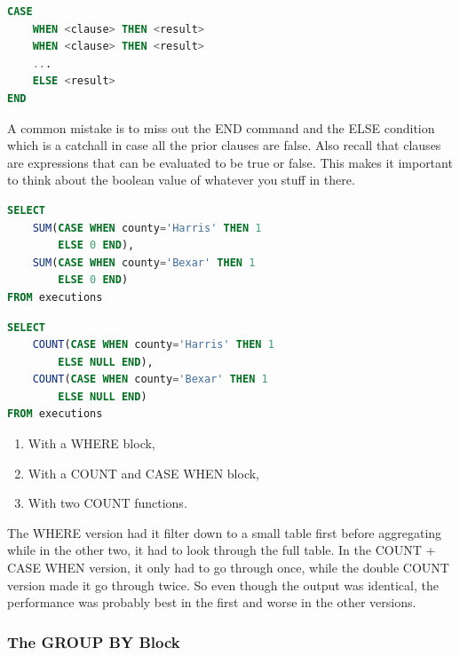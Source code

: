 \documentclass{article}
\begin{document}
\vspace{8pt} \begin{lstlisting}[language=SQL]
CASE
    WHEN <clause> THEN <result>
    WHEN <clause> THEN <result>
    ...
    ELSE <result>
END
\end{lstlisting} \vspace{8pt}

A common mistake is to miss out the END command and the ELSE condition which is a catchall in case all the prior clauses are false. Also recall that clauses are expressions that can be evaluated to be true or false. This makes it important to think about the boolean value of whatever you stuff in there.

\vspace{8pt} \begin{lstlisting}[language=SQL]
SELECT
    SUM(CASE WHEN county='Harris' THEN 1
        ELSE 0 END),
    SUM(CASE WHEN county='Bexar' THEN 1
        ELSE 0 END)
FROM executions
\end{lstlisting} \vspace{8pt}

\vspace{8pt} \begin{lstlisting}[language=SQL]
SELECT
    COUNT(CASE WHEN county='Harris' THEN 1
        ELSE NULL END),
    COUNT(CASE WHEN county='Bexar' THEN 1
        ELSE NULL END)
FROM executions
\end{lstlisting} \vspace{8pt}

\begin{enumerate}
    \item With a WHERE block,
    \item With a COUNT and CASE WHEN block,
    \item With two COUNT functions.
\end{enumerate}

The WHERE version had it filter down to a small table first before aggregating while in the other two, it had to look through the full table. In the COUNT + CASE WHEN version, it only had to go through once, while the double COUNT version made it go through twice. So even though the output was identical, the performance was probably best in the first and worse in the other versions.

\subsubsection{The GROUP BY Block}
\end{document}

